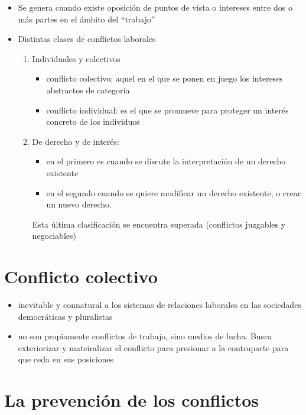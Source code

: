 \documentclass[spanish,12pt,a4paper,titlepage]{report}
\begin{document}
\begin{itemize}
\item Se genera cuando existe oposición de puntos de vista o intereses entre dos o más partes en el ámbito del ``trabajo''
\item Distintas clases de conflictos laborales
\begin{enumerate}
\item Individuales y colectivos
\begin{itemize}
\item conflicto colectivo: aquel en el que se ponen en juego los intereses abstractos de categoría 
\item conflicto individual: es el que se promueve para proteger un interés concreto de los individuos
\end{itemize}
\item De derecho y de interés:
\begin{itemize}
\item  en el primero es cuando se discute la interpretación de un derecho existente
\item en el segundo cuando se quiere modificar un derecho existente, o crear un nuevo derecho.
\end{itemize}

Esta última clasificación se encuentra superada (conflictos juzgables y negociables)
\end{enumerate}
\end{itemize}

\section{Conflicto colectivo}

\begin{itemize}
\item inevitable y connatural a los sistemas de relaciones laborales en las sociedades democráticas y pluralistas
\item no son propiamente conflictos de trabajo, sino medios de lucha. Busca exteriorizar y mateiralizar el conflicto para presionar a la contraparte para que ceda en sus posiciones
\end{itemize}

\section{La prevención de los conflictos}
\end{document}
